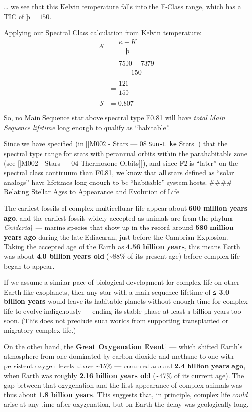 \documentclass[
  letterpaper,
]{book}
\begin{document}
\ldots{} we see that this Kelvin temperature falls into the F-Class
range, which has a TIC of \(þ = 150\).

Applying our Spectral Class calculation from Kelvin temperature: \[
\begin{align}
\mathcal{S} &= \dfrac{\kappa - K}{þ} \\ \\
 &= \dfrac{7500 - 7379}{150} \\ \\
 &= \dfrac{121}{150} \\ \\
\mathcal{S} &= 0.807 \\ \\
\end{align}
\]So, no Main Sequence star above spectral type F0.81 will have
\emph{total Main Sequence lifetime} long enough to qualify as
``habitable''.

Since we have specified (in {[}{[}M002 - Stars --- 08 \texttt{Sun-Like}
Stars{]}{]}) that the spectral type range for stars with perannual
orbits within the parahabitable zone (see {[}{[}M002 - Stars --- 04
Thermozone Orbits{]}{]}), and since F2 is ``later'' on the spectral
class continuum than F0.81, we know that all stars defined as ``solar
analogs'' have lifetimes long enough to be ``habitable'' system hosts.
\#\#\#\# Relating Stellar Ages to Appearance and Evolution of Life

The earliest fossils of complex multicellular life appear about
\textbf{600 million years ago}, and the earliest fossils widely accepted
as animals are from the phylum \emph{Cnidaria}† --- marine species that
show up in the record around \textbf{580 million years ago} during the
late Ediacaran, just before the Cambrian Explosion. Taking the accepted
age of the Earth as \textbf{4.56 billion years}, this means Earth was
about \textbf{4.0 billion years old} (\textasciitilde88\% of its present
age) before complex life began to appear.

If we assume a similar pace of biological development for complex life
on other Earth-like exoplanets, then any star with a main sequence
lifetime of \textbf{≤ 3.0 billion years} would leave its habitable
planets without enough time for complex life to evolve indigenously ---
ending its stable phase at least a billion years too soon. (This does
not preclude such worlds from supporting transplanted or migratory
complex life.)

On the other hand, the \textbf{Great Oxygenation Event}‡ --- which
shifted Earth's atmosphere from one dominated by carbon dioxide and
methane to one with persistent oxygen levels above \textasciitilde15\%
--- occurred around \textbf{2.4 billion years ago}, when Earth was
roughly \textbf{2.16 billion years old} (\textasciitilde47\% of its
current age). The gap between that oxygenation and the first appearance
of complex animals was thus about \textbf{1.8 billion years}. This
suggests that, in principle, complex life \emph{could} arise at any time
after oxygenation, but on Earth the delay was geologically long.
\end{document}
